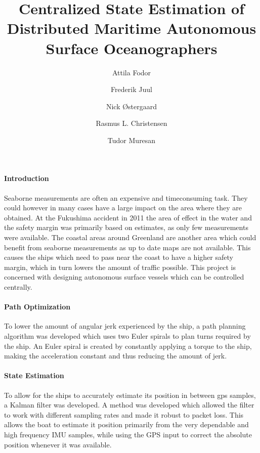\documentclass{article}
\begin{document}
\title{Centralized State Estimation of Distributed Maritime Autonomous Surface Oceanographers}
\author{Attila Fodor \and Frederik Juul \and Nick \O stergaard \and Rasmus L. Christensen \and Tudor Muresan}
\maketitle
\paragraph{Introduction}
Seaborne measurements are often an expensive and timeconsuming task. They could however in many cases have a large impact on the area where they are obtained. At the Fukushima accident in 2011 the area of effect in the water and the safety margin was primarily based on estimates, as only few measurements were available. The coastal areas around Greenland are another area which could benefit from seaborne measurements as up to date maps are not available. This causes the ships which need to pass near the coast to have a higher safety margin, which in turn lowers the amount of traffic possible. This project is concerned with designing autonomous surface vessels which can be controlled centrally. 

\paragraph{Path Optimization}
To lower the amount of angular jerk experienced by the ship, a path planning algorithm was developed which uses two Euler spirals to plan turns required by the ship. An Euler spiral is created by constantly applying a torque to the ship, making the acceleration constant and thus reducing the amount of jerk. 

\paragraph{State Estimation}
To allow for the ships to accurately estimate its position in between gps samples, a Kalman filter was developed. A method was developed which allowed the filter to work with different sampling rates and made it robust to packet loss. This allows the boat to estimate it position primarily from the very dependable and high frequency IMU samples, while using the GPS input to correct the absolute position whenever it was available.
\end{document}
